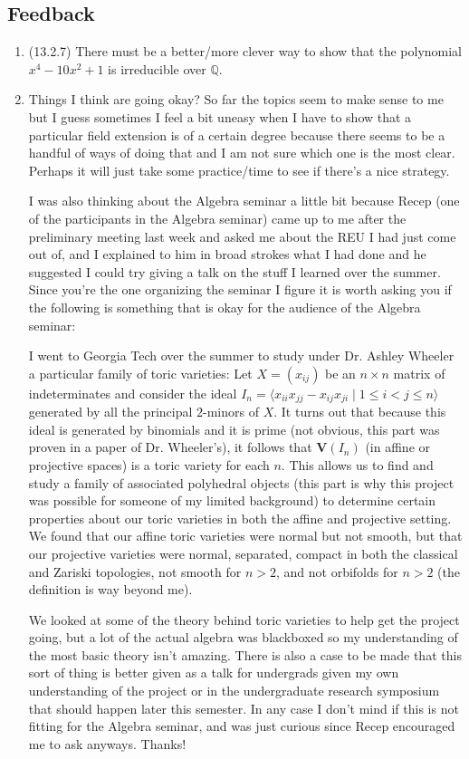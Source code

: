 \documentclass[11pt]{article}
\begin{document}
\subsection*{Feedback}
\begin{enumerate}
    \item (13.2.7) There must be a better/more clever way to show that the polynomial $x^4-10x^2+1$ is irreducible over $\mathbb{Q}$.
    \item Things I think are going okay? So far the topics seem to make sense to me but I guess sometimes I feel a bit uneasy when I have to show that a particular field extension is of a certain degree because there seems to be a handful of ways of doing that and I am not sure which one is the most clear. Perhaps it will just take some practice/time to see if there's a nice strategy.
    
    I was also thinking about the Algebra seminar a little bit because Recep (one of the participants in the Algebra seminar) came up to me after the preliminary meeting last week and asked me about the REU I had just come out of, and I explained to him in broad strokes what I had done and he suggested I could try giving a talk on the stuff I learned over the summer. Since you're the one organizing the seminar I figure it is worth asking you if the following is something that is okay for the audience of the Algebra seminar:

    I went to Georgia Tech over the summer to study under Dr. Ashley Wheeler a particular family of toric varieties: Let $X = (x_{ij})$ be an $n\times n$ matrix of indeterminates and consider the ideal $I_n = \langle x_{ii}x_{jj}-x_{ij}x_{ji}\mid 1\leq i < j\leq n \rangle$ generated by all the principal $2$-minors of $X$. It turns out that because this ideal is generated by binomials and it is prime (not obvious, this part was proven in a paper of Dr. Wheeler's), it follows that $\mathbf{V}(I_n)$ (in affine or projective spaces) is a toric variety for each $n$. This allows us to find and study a family of associated polyhedral objects (this part is why this project was possible for someone of my limited background) to determine certain properties about our toric varieties in both the affine and projective setting. We found that our affine toric varieties were normal but not smooth, but that our projective varieties were normal, separated, compact in both the classical and Zariski topologies, not smooth for $n>2$, and not orbifolds for $n>2$ (the definition is way beyond me).

    We looked at some of the theory behind toric varieties to help get the project going, but a lot of the actual algebra was blackboxed so my understanding of the most basic theory isn't amazing. There is also a case to be made that this sort of thing is better given as a talk for undergrads given my own understanding of the project or in the undergraduate research symposium that should happen later this semester. In any case I don't mind if this is not fitting for the Algebra seminar, and was just curious since Recep encouraged me to ask anyways. Thanks!
\end{enumerate}
\end{document}
